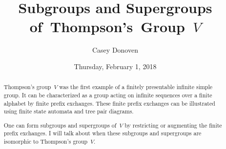 \documentclass{UAmathtalk}
\author{Casey Donoven}
\title{Subgroups and Supergroups of~Thompson's~Group~$V$}
\date{Thursday, February 1, 2018}
\begin{document}
\maketitle

\begin{abstract}
Thompson's group~$V$ was the first example of a finitely presentable infinite simple group.  It can be characterized as a group acting on infinite sequences over a finite alphabet by finite prefix exchanges.  These finite prefix exchanges can be illustrated using finite state automata and tree pair diagrams.

One can form subgroups and supergroups of~$V$ by restricting or augmenting the finite prefix exchanges.   I will talk about when these subgroups and supergroups are isomorphic to Thompson's group~$V$.
\end{abstract}
\end{document}
